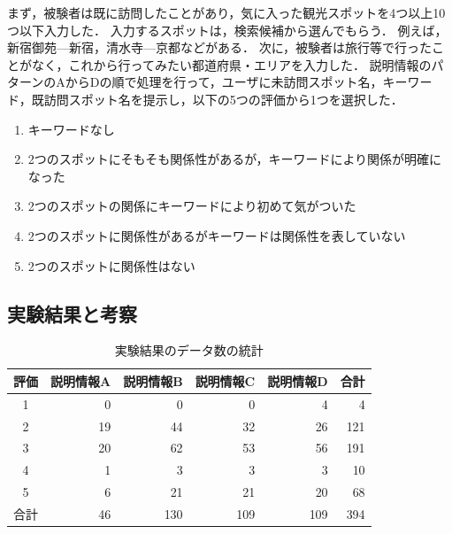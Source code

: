 \documentclass{deimj}
\begin{document}
まず，被験者は既に訪問したことがあり，気に入った観光スポットを4つ以上10つ以下入力した．
入力するスポットは，検索候補から選んでもらう．
例えば，新宿御苑---新宿，清水寺---京都などがある．
次に，被験者は旅行等で行ったことがなく，これから行ってみたい都道府県・エリアを入力した．
説明情報のパターンのAからDの順で処理を行って，ユーザに未訪問スポット名，キーワード，既訪問スポット名を提示し，以下の5つの評価から1つを選択した．
\begin{enumerate}
  \item キーワードなし
  \item 2つのスポットにそもそも関係性があるが，キーワードにより関係が明確になった
  \item 2つのスポットの関係にキーワードにより初めて気がついた
  \item 2つのスポットに関係性があるがキーワードは関係性を表していない
  \item 2つのスポットに関係性はない
\end{enumerate}


\subsection{実験結果と考察}
\label{subsec:実験結果}

\begin{table}[t]
  \caption{実験結果のデータ数の統計}
  \label{table:実験結果のデータ数の統計}
  \centering
  \begin{tabular}{c|r|r|r|r|r}
  \hline
  評価 & \multicolumn{1}{c|}{説明情報A} & \multicolumn{1}{c|}{説明情報B} & \multicolumn{1}{c|}{説明情報C} & \multicolumn{1}{c|}{説明情報D} & \multicolumn{1}{c}{合計} \\ \hline
  1  & 0                      & 0                      & 0                      & 4                      & 4                      \\
  2  & 19                     & 44                     & 32                     & 26                     & 121                    \\
  3  & 20                     & 62                     & 53                     & 56                     & 191                    \\
  4  & 1                      & 3                      & 3                      & 3                      & 10                     \\
  5  & 6                      & 21                     & 21                     & 20                     & 68                     \\\hline
  合計 & 46                     & 130                    & 109                    & 109                    & 394                    \\ \hline
  \end{tabular}
\end{table}
\end{document}
